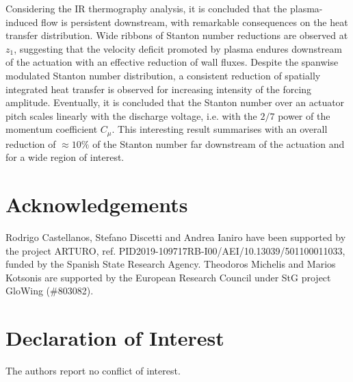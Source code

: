 Considering the IR thermography analysis, it is concluded that the plasma-induced flow is persistent downstream, with remarkable consequences on the heat transfer distribution. Wide ribbons of Stanton number reductions are observed at $z_1$, suggesting that the velocity deficit promoted by plasma endures downstream of the actuation with an effective reduction of wall fluxes. Despite the spanwise modulated Stanton number distribution, a consistent reduction of spatially integrated heat transfer is observed for increasing intensity of the forcing amplitude. Eventually, it is concluded that the Stanton number over an actuator pitch scales linearly with the discharge voltage, i.e. with the $2/7$ power of the momentum coefficient $C_\mu$. This interesting result summarises with an overall reduction of $\approx10\%$ of the Stanton number far downstream of the actuation and for a wide region of interest. 


\section*{Acknowledgements}
Rodrigo Castellanos, Stefano Discetti and Andrea Ianiro have been supported by the project ARTURO, ref. PID2019-109717RB-I00/AEI/10.13039/501100011033, funded by the Spanish State Research Agency.
Theodoros Michelis and Marios Kotsonis are supported by the European Research Council under StG project GloWing (\#803082).

\section*{Declaration of Interest}
The authors report no conflict of interest.